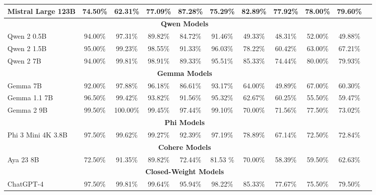\documentclass[11pt]{article}
\begin{document}
\begin{table}[ht]
{\begin{tabular}{@{}lccccc|ccccc@{}}
        Mistral Large 123B  & 74.50\% & \cellcolor{red!20}62.31\% & 77.09\% & 87.28\% & 75.29\% & 82.89\% & \cellcolor{green!20}77.92\% & \cellcolor{yellow!20}78.00\% & 79.60\% \\
        \midrule
        \multicolumn{10}{c}{\textbf{Qwen Models}} \\ 
        Qwen 2 0.5B      & 94.00\% & 97.31\% & 89.82\% & 84.72\% & 91.46\% & 49.33\% & 48.31\% & 52.00\% & 49.88\% \\ 
        Qwen 2 1.5B      & 95.00\% & 99.23\% & 98.55\% & 91.33\% & 96.03\% & 78.22\% & 60.42\% & 63.00\% & 67.21\% \\
        Qwen 2 7B        & 94.00\% & \cellcolor{yellow!20}99.81\% & 98.91\% & 89.33\% & 95.51\% & 85.33\% & 74.44\% & \cellcolor{green!20}80.00\% & \cellcolor{yellow!20}79.93\% \\
        \midrule
        \multicolumn{10}{c}{\textbf{Gemma Models}} \\ 
        Gemma 7B         & 92.00\% & 97.88\% & 96.18\% & 86.61\% & 93.17\% & 64.00\% & 49.89\% & 67.00\% & 60.30\% \\ 
        Gemma 1.1 7B     & 96.50\% & 99.42\% & 93.82\% & 91.56\% & 95.32\% & 62.67\% & 60.25\% & 55.50\% & 59.47\% \\
        Gemma 2 9B       & \cellcolor{green!20}99.50\% & \cellcolor{green!20}100.00\% & \cellcolor{yellow!20}99.45\% & \cellcolor{green!20}97.44\% & \cellcolor{green!20}99.10\% & 70.00\% & 71.56\% & 77.50\% & 73.02\% \\
        \midrule
        \multicolumn{10}{c}{\textbf{Phi Models}} \\ 
        Phi 3 Mini 4K 3.8B    & 97.50\% & 99.62\% & 99.27\% & 92.39\% & 97.19\% & 78.89\% & 67.14\% & 72.50\% & 72.84\% \\ 
        \midrule
        \multicolumn{10}{c}{\textbf{Cohere Models}} \\ 
        Aya 23 8B        & 72.50\% & 91.35\% & 89.82\% & \cellcolor{red!20}72.44\% & 81.53 \% & 70.00\% & 58.39\% & 59.50\% & 62.63\% \\
        \midrule \midrule
        \multicolumn{10}{c}{\textbf{Closed-Weight Models}} \\ %
        ChatGPT-4               & \cellcolor{red!20}97.50\% & \cellcolor{red!20}99.81\% & \cellcolor{red!20}99.64\% & \cellcolor{red!20}95.94\% & \cellcolor{red!20}98.22\% & \cellcolor{green!20}85.33\% & \cellcolor{green!20}77.67\% & \cellcolor{green!20}75.50\% & \cellcolor{green!20}79.50\%\\

\end{tabular}}
\end{table}
\end{document}
